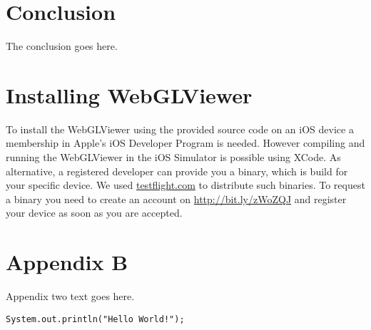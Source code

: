 \documentclass[12pt,journal,compsoc]{IEEEtran}
\begin{document}
\section{Conclusion}
The conclusion goes here.





\appendices
\section*{Installing WebGLViewer}
To install the WebGLViewer using the provided source code on an iOS device a membership in Apple's iOS Developer Program is needed. However compiling and running the WebGLViewer in the iOS Simulator is possible using XCode. As alternative, a registered developer can provide you a binary, which is build for your specific device. We used \url{testflight.com} to distribute such binaries. To request a binary you need to create an account on \url{http://bit.ly/zWoZQJ} and register your device as soon as you are accepted.

\section*{Appendix B}
Appendix two text goes here.

\begin{lstlisting}[label=code:hello_world, caption={Hello World Code Snippet}]
System.out.println("Hello World!");
\end{lstlisting}

\ifCLASSOPTIONcaptionsoff
  \newpage
\fi





\end{document}
